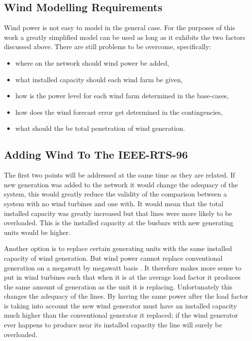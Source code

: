 \documentclass[a4paper,oneside,12pt]{report}
\begin{document}
\subsection{Wind Modelling Requirements}

Wind power is not easy to model in the general case. For the purposes of this work a greatly simplified model can be used as long as it exhibits the two factors discussed above. There are still problems to be overcome, specifically: 

\begin{itemize}
\item where on the network should wind power be added, 
\item what installed capacity should each wind farm be given, 
\item how is the power level for each wind farm determined in the base-cases,
\item how does the wind forecast error get determined in the contingencies,
\item what should the be total penetration of wind generation.
\end{itemize}

\subsection{Adding Wind To The IEEE-RTS-96}

The first two points will be addressed at the same time as they are related. If new generation was added to the network it would change the adequacy of the system, this would greatly reduce the validity of the comparison between a system with no wind turbines and one with. It would mean that the total installed capacity was greatly increased but that lines were more likely to be overloaded. This is the installed capacity at the busbars with new generating units would be higher. 

Another option is to replace certain generating units with the same installed capacity of wind generation. But wind power cannot replace conventional generation on a megawatt by megawatt basis \cite{Strbac2007}. It therefore makes more sense to put in wind turbines such that when it is at the average load factor it produces the same amount of generation as the unit it is replacing. Unfortunately this changes the adequacy of the lines. By having the same power after the load factor is taking into account the new wind generator must have an installed capacity much higher than the conventional generator it replaced; if the wind generator ever happens to produce near its installed capacity the line will surely be overloaded. 
\end{document}
